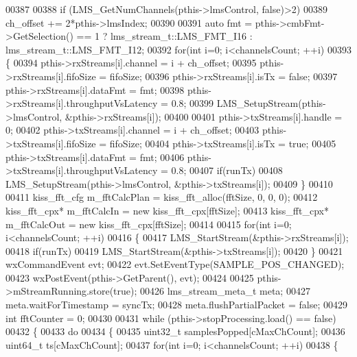\begin{DoxyCode}
{{{00387 
00388     \textcolor{keywordflow}{if} (LMS_GetNumChannels(pthis->lmsControl, \textcolor{keyword}{false})>2)
00389         ch\_offset += 2*pthis->lmsIndex;
00390 
00391     \textcolor{keyword}{auto} fmt = pthis->cmbFmt->GetSelection() == 1 ? lms_stream_t::LMS_FMT_I16 : 
      lms_stream_t::LMS_FMT_I12;
00392     \textcolor{keywordflow}{for}(\textcolor{keywordtype}{int} i=0; i<channelsCount; ++i)
00393     \{
00394         pthis->rxStreams[i].channel = i + ch\_offset;
00395         pthis->rxStreams[i].fifoSize = fifoSize;
00396         pthis->rxStreams[i].isTx = \textcolor{keyword}{false};
00397         pthis->rxStreams[i].dataFmt = fmt;
00398         pthis->rxStreams[i].throughputVsLatency = 0.8;
00399         LMS_SetupStream(pthis->lmsControl, &pthis->rxStreams[i]);
00400 
00401         pthis->txStreams[i].handle = 0;
00402         pthis->txStreams[i].channel = i + ch\_offset;
00403         pthis->txStreams[i].fifoSize = fifoSize;
00404         pthis->txStreams[i].isTx = \textcolor{keyword}{true};
00405         pthis->txStreams[i].dataFmt = fmt;
00406         pthis->txStreams[i].throughputVsLatency = 0.8;
00407         \textcolor{keywordflow}{if}(runTx)
00408             LMS_SetupStream(pthis->lmsControl, &pthis->txStreams[i]);
00409     \}
00410 
00411     kiss_fft_cfg m\_fftCalcPlan = kiss_fft_alloc(fftSize, 0, 0, 0);
00412     kiss_fft_cpx* m\_fftCalcIn = \textcolor{keyword}{new} kiss_fft_cpx[fftSize];
00413     kiss_fft_cpx* m\_fftCalcOut = \textcolor{keyword}{new} kiss_fft_cpx[fftSize];
00414 
00415     \textcolor{keywordflow}{for}(\textcolor{keywordtype}{int} i=0; i<channelsCount; ++i)
00416     \{
00417         LMS_StartStream(&pthis->rxStreams[i]);
00418         \textcolor{keywordflow}{if}(runTx)
00419             LMS_StartStream(&pthis->txStreams[i]);
00420     \}
00421     wxCommandEvent evt;
00422     evt.SetEventType(SAMPLE\_POS\_CHANGED);
00423     wxPostEvent(pthis->GetParent(), evt);
00424 
00425     pthis->mStreamRunning.store(\textcolor{keyword}{true});
00426     lms_stream_meta_t meta;
00427     meta.waitForTimestamp = syncTx;
00428     meta.flushPartialPacket = \textcolor{keyword}{false};
00429     \textcolor{keywordtype}{int} fftCounter = 0;
00430 
00431     \textcolor{keywordflow}{while} (pthis->stopProcessing.load() == \textcolor{keyword}{false})
00432     \{
00433         \textcolor{keywordflow}{do}
00434         \{
00435             uint32\_t samplesPopped[cMaxChCount];
00436             uint64\_t ts[cMaxChCount];
00437             \textcolor{keywordflow}{for}(\textcolor{keywordtype}{int} i=0; i<channelsCount; ++i)
00438             \{
}}}
\end{DoxyCode}
